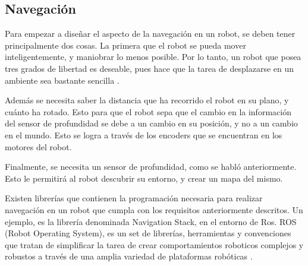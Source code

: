 \subsection{Navegación}

Para empezar a diseñar el aspecto de la navegación en un robot, se deben tener principalmente dos cosas. La primera que el robot se pueda mover inteligentemente, y maniobrar lo menos posible. Por lo tanto, un robot que posea tres grados de libertad es deseable, pues hace que la tarea de desplazarse en un ambiente sea bastante sencilla \cite{Batlle2009}.

Además se necesita saber la distancia que ha recorrido el robot en su plano, y cuánto ha rotado. Esto para que el robot sepa que el cambio en la información del sensor de profundidad se debe a un cambio en su posición, y no a un cambio en el mundo. Esto se logra a través de los encoders que se encuentran en los motores del robot.

Finalmente, se necesita un sensor de profundidad, como se habló anteriormente. Esto le permitirá al robot descubrir su entorno, y crear un mapa del mismo.

Existen librerías que contienen la programación necesaria para realizar navegación en un robot que cumpla con los requisitos anteriormente descritos. Un ejemplo, es la librería denominada Navigation Stack, en el entorno de Ros. ROS (Robot Operating System), es un set de librerías, herramientas y convenciones que tratan de simplificar la tarea de crear comportamientos roboticos complejos y robustos a través de una amplia variedad de plataformas robóticas \cite{Quigley2009}.

